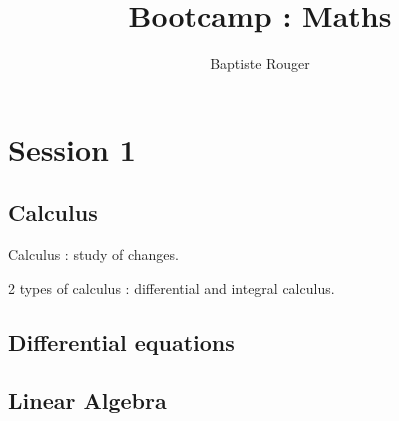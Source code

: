 \documentclass{article}
\title{Bootcamp : Maths}
\author{Baptiste Rouger}
\begin{document}
    \maketitle

    \section{Session 1}


        \subsection{Calculus}

        Calculus : study of changes.

        2 types of calculus : differential and integral calculus.

        \subsection{Differential equations}

        \subsection{Linear Algebra}
\end{document}
